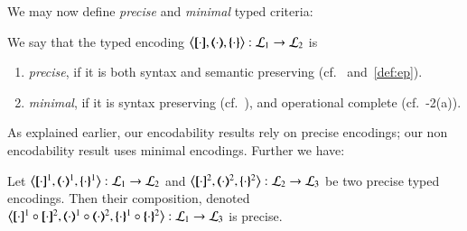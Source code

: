 \smallskip 


We may now define \emph{precise} and \emph{minimal} typed criteria: 

\smallskip 

\begin{definition}\rm\label{def:goodenc}
We say that 
	the typed encoding 
	$\enco{\map{\cdot}, \mapt{\cdot}, \mapa{\cdot}}: \tyl{L}_1 \to \tyl{L}_2$ is 
	\begin{enumerate}[$\bullet$]
	\item \emph{precise}, if it is both syntax and semantic preserving (cf.~ and~\ref{def:ep}).
	\item \emph{minimal}, if it is syntax preserving 
	(cf.~),
	and operational complete (cf.~-2(a)).
	\end{enumerate}
\end{definition}

\smallskip 

\noi As explained earlier, our encodability results %
rely on precise encodings; 
our non encodability result %
uses minimal encodings.
Further we have:

\smallskip 

\begin{proposition}\rm
	\label{pro:composition}
	Let %
	$\enco{\map{\cdot}^{1}, \mapt{\cdot}^{1}, \mapa{\cdot}^{1}}: \tyl{L}_1 \to \tyl{L}_2$
	and 
	$\enco{\map{\cdot}^{2}, \mapt{\cdot}^{2}, \mapa{\cdot}^{2}}: \tyl{L}_2 \to \tyl{L}_3$
	be two precise typed encodings.
	Then their composition, denoted 
	$\enco{\map{\cdot}^{1} \circ \map{\cdot}^{2}, \mapt{\cdot}^{1} \circ \mapt{\cdot}^{2}, \mapa{\cdot}^{1}\circ \mapa{\cdot}^{2}}: \tyl{L}_1 \to \tyl{L}_3$
	is precise. 
\end{proposition}

